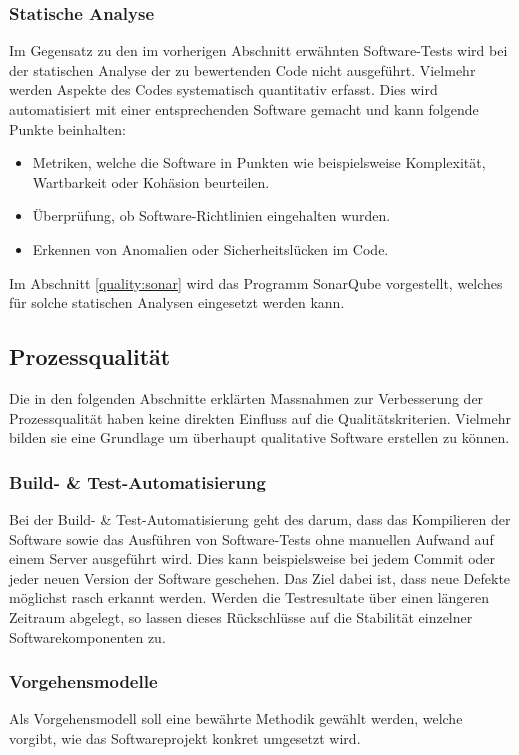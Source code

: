 \subsubsection{Statische Analyse}
Im Gegensatz zu den im vorherigen Abschnitt erwähnten Software-Tests wird bei der statischen Analyse der zu bewertenden Code nicht ausgeführt.
Vielmehr werden Aspekte des Codes systematisch quantitativ erfasst.
Dies wird automatisiert mit einer entsprechenden Software gemacht und kann folgende Punkte beinhalten:
\begin{itemize}
   \item Metriken, welche die Software in Punkten wie beispielsweise Komplexität, Wartbarkeit oder Kohäsion beurteilen.
   \item Überprüfung, ob Software-Richtlinien eingehalten wurden.
   \item Erkennen von Anomalien oder Sicherheitslücken im Code.
\end{itemize}

Im Abschnitt \ref{quality:sonar} wird das Programm SonarQube vorgestellt, welches für solche statischen Analysen eingesetzt werden kann.

\subsection{Prozessqualität}
Die in den folgenden Abschnitte erklärten Massnahmen zur Verbesserung der Prozessqualität haben keine direkten Einfluss auf die Qualitätskriterien.
Vielmehr bilden sie eine Grundlage um überhaupt qualitative Software erstellen zu können.

\subsubsection{Build- \& Test-Automatisierung}
Bei der Build- \& Test-Automatisierung geht des darum, dass das Kompilieren der Software sowie das Ausführen von Software-Tests ohne manuellen Aufwand auf einem Server ausgeführt wird.
Dies kann beispielsweise bei jedem Commit oder jeder neuen Version der Software geschehen.
Das Ziel dabei ist, dass neue Defekte möglichst rasch erkannt werden.
Werden die Testresultate über einen längeren Zeitraum abgelegt, so lassen dieses Rückschlüsse auf die Stabilität einzelner Softwarekomponenten zu.

\subsubsection{Vorgehensmodelle}
Als Vorgehensmodell soll eine bewährte Methodik gewählt werden, welche vorgibt, wie das Softwareprojekt konkret umgesetzt wird.


